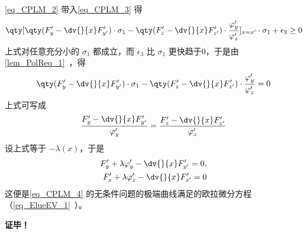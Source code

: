\autoref{eq_CPLM_2} 带入\autoref{eq_CPLM_3} 得
\begin{equation}
\qty[\qty(F'_y-\dv{}{x}F'_{y'})\cdot\sigma_1-\qty(F'_z-\dv{}{x}F'_{z'})\cdot\frac{\varphi'_y}{\varphi'_z}]_{x=x'}\cdot\sigma_1+\epsilon_3\geq0
\end{equation}
上式对任意充分小的 $\sigma_1$ 都成立，而 $\epsilon_3$ 比 $\sigma_1$ 更快趋于0，于是由\autoref{lem_PolReq_1}~，得
\begin{equation}
\qty(F'_y-\dv{}{x}F'_{y'})\cdot\sigma_1-\qty(F'_z-\dv{}{x}F'_{z'})\cdot\frac{\varphi'_y}{\varphi'_z}=0
\end{equation}
上式可写成
\begin{equation}
\frac{F'_y-\dv{}{x}F'_{y'}}{\varphi'_y}=\frac{F'_z-\dv{}{x}F'_{z'}}{\varphi'_z}
\end{equation}
设上式等于 $-\lambda(x)$，于是
\begin{equation}
\begin{aligned}
F'_y+\lambda\varphi'_y-\dv{}{x}F'_{y'}=0,\\
F'_z+\lambda\varphi'_z-\dv{}{x}F'_{z'}=0
\end{aligned}
\end{equation}
这便是\autoref{eq_CPLM_4} 的无条件问题的极端曲线满足的欧拉微分方程（\autoref{eq_ElueEV_1}~）。



\textbf{证毕！}